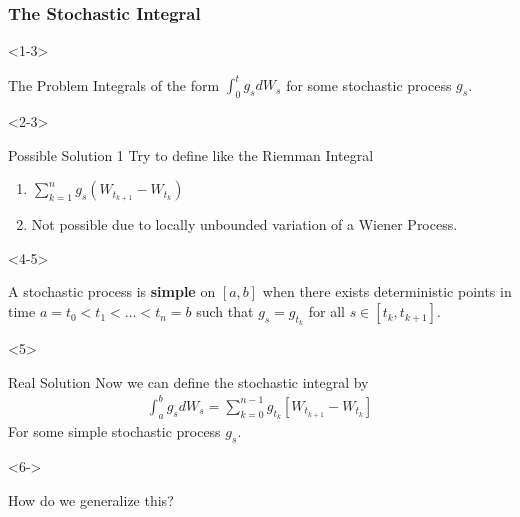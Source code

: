 \documentclass[10pt]{beamer}
\begin{document}
\begin{frame}[t]
  \frametitle{The Stochastic Integral}
  \begin{onlyenv}<1-3>
    \begin{block}{The Problem}
      Integrals of the form $\displaystyle\int_{0}^{t}g_s dW_s$ for some stochastic process $g_s$.
    \end{block}
  \end{onlyenv}
  \begin{onlyenv}<2-3>
    \begin{block}{Possible Solution 1}
      Try to define like the Riemman Integral
      \begin{enumerate}
        \item<2-> $\displaystyle\sum_{k = 1}^{n}g_s(W_{t_{k+1}} - W_{t_{k}})$
        \item<3-> Not possible due to locally unbounded variation of a Wiener Process.
      \end{enumerate}
    \end{block}
  \end{onlyenv}
  \begin{onlyenv}<4-5>
    \begin{definition}
      A stochastic process is \textbf{simple} on $[a,b]$ when there exists deterministic points in time $a = t_0 < t_1 < \dots < t_n = b$ such that $g_s = g_{t_k}$ for all $s \in [t_k, t_{k+1}]$.
    \end{definition}
  \end{onlyenv}
  \begin{onlyenv}<5>
      \begin{block}{Real Solution}
        Now we can define the stochastic integral by
        \begin{align*}
          \displaystyle\int_{a}^{b}g_s dW_s = \displaystyle\sum_{k = 0}^{n - 1}g_{t_k}[W_{t_{k+1}} - W_{t_{k}}]
        \end{align*}
        For some simple stochastic process $g_s$.
      \end{block}
  \end{onlyenv}
  \begin{onlyenv}<6->
    \begin{block}{How do we generalize this?}
    \end{block}
  \end{onlyenv}
\end{frame}
\end{document}

